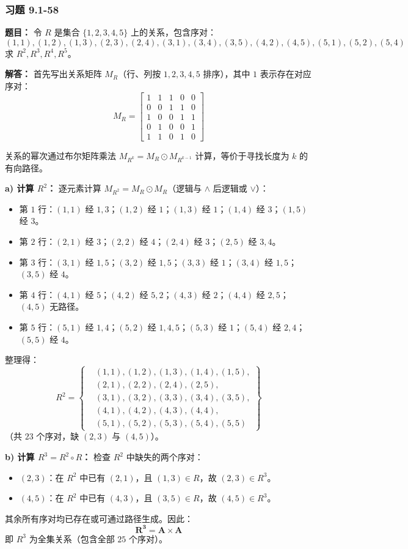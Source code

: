 \documentclass[11pt,UTF8]{article}
\begin{document}
\subsubsection*{习题 9.1-58}
\textbf{题目：} 令 $R$ 是集合 $\{1,2,3,4,5\}$ 上的关系，包含序对：
\[ (1,1),(1,2),(1,3),(2,3),(2,4),(3,1),(3,4),(3,5),(4,2),(4,5),(5,1),(5,2),(5,4) \]
求 $R^2, R^3, R^4, R^5$。

\textbf{解答：}
首先写出关系矩阵 $M_R$（行、列按 $1,2,3,4,5$ 排序），其中 $1$ 表示存在对应序对：
\[ M_R = \begin{bmatrix}
1 & 1 & 1 & 0 & 0 \\
0 & 0 & 1 & 1 & 0 \\
1 & 0 & 0 & 1 & 1 \\
0 & 1 & 0 & 0 & 1 \\
1 & 1 & 0 & 1 & 0
\end{bmatrix} \]

关系的幂次通过布尔矩阵乘法 $M_{R^{k}} = M_R \odot M_{R^{k-1}}$ 计算，等价于寻找长度为 $k$ 的有向路径。

\textbf{a) 计算 $R^2$：}
逐元素计算 $M_{R^2} = M_R \odot M_R$（逻辑与 $\land$ 后逻辑或 $\lor$）：
\begin{itemize}
    \item 第 $1$ 行：$(1,1)$ 经 $1,3$；$(1,2)$ 经 $1$；$(1,3)$ 经 $1$；$(1,4)$ 经 $3$；$(1,5)$ 经 $3$。
    \item 第 $2$ 行：$(2,1)$ 经 $3$；$(2,2)$ 经 $4$；$(2,4)$ 经 $3$；$(2,5)$ 经 $3,4$。
    \item 第 $3$ 行：$(3,1)$ 经 $1,5$；$(3,2)$ 经 $1,5$；$(3,3)$ 经 $1$；$(3,4)$ 经 $1,5$；$(3,5)$ 经 $4$。
    \item 第 $4$ 行：$(4,1)$ 经 $5$；$(4,2)$ 经 $5,2$；$(4,3)$ 经 $2$；$(4,4)$ 经 $2,5$；$(4,5)$ 无路径。
    \item 第 $5$ 行：$(5,1)$ 经 $1,4$；$(5,2)$ 经 $1,4,5$；$(5,3)$ 经 $1$；$(5,4)$ 经 $2,4$；$(5,5)$ 经 $4$。
\end{itemize}

整理得：
\[ R^2 = \left\{
\begin{aligned}
&(1,1),(1,2),(1,3),(1,4),(1,5), \\
&(2,1),(2,2),(2,4),(2,5), \\
&(3,1),(3,2),(3,3),(3,4),(3,5), \\
&(4,1),(4,2),(4,3),(4,4), \\
&(5,1),(5,2),(5,3),(5,4),(5,5)
\end{aligned}
\right\} \]
（共 $23$ 个序对，缺 $(2,3)$ 与 $(4,5)$）。

\textbf{b) 计算 $R^3 = R^2 \circ R$：}
检查 $R^2$ 中缺失的两个序对：
\begin{itemize}
    \item $(2,3)$：在 $R^2$ 中已有 $(2,1)$，且 $(1,3) \in R$，故 $(2,3) \in R^3$。
    \item $(4,5)$：在 $R^2$ 中已有 $(4,3)$，且 $(3,5) \in R$，故 $(4,5) \in R^3$。
\end{itemize}
其余所有序对均已存在或可通过路径生成。因此：
\[ \mathbf{R^3 = A \times A} \]
即 $R^3$ 为全集关系（包含全部 $25$ 个序对）。
\end{document}
